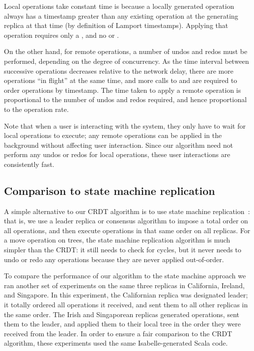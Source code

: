 \documentclass[10pt,journal,compsoc]{IEEEtran}
\begin{document}
Local operations take constant time is because a locally generated operation always has a timestamp greater than any existing operation at the generating replica at that time (by definition of Lamport timestamps).
Applying that operation requires only a , and no  or .

On the other hand, for remote operations, a number of undos and redos must be performed, depending on the degree of concurrency.
As the time interval between successive operations decreases relative to the network delay, there are more operations ``in flight'' at the same time, and more calls to  and  are required to order operations by timestamp.
The time taken to apply a remote operation is proportional to the number of undos and redos required, and hence proportional to the operation rate.

Note that when a user is interacting with the system, they only have to wait for local operations to execute; any remote operations can be applied in the background without affecting user interaction.
Since our algorithm need not perform any undos or redos for local operations, these user interactions are consistently fast.

\subsection{Comparison to state machine replication}\label{sec:smr}

A simple alternative to our CRDT algorithm is to use state machine replication~\cite{Schneider:1990vy}: that is, we use a leader replica or consensus algorithm to impose a total order on all operations, and then execute operations in that same order on all replicas.
For a move operation on trees, the state machine replication algorithm is much simpler than the CRDT: it still needs to check for cycles, but it never needs to undo or redo any operations because they are never applied out-of-order.

To compare the performance of our algorithm to the state machine approach we ran another set of experiments on the same three replicas in California, Ireland, and Singapore.
In this experiment, the Californian replica was designated leader; it totally ordered all operations it received, and sent them to all other replicas in the same order.
The Irish and Singaporean replicas generated operations, sent them to the leader, and applied them to their local tree in the order they were received from the leader.
In order to ensure a fair comparison to the CRDT algorithm, these experiments used the same Isabelle-generated Scala code.
\end{document}
